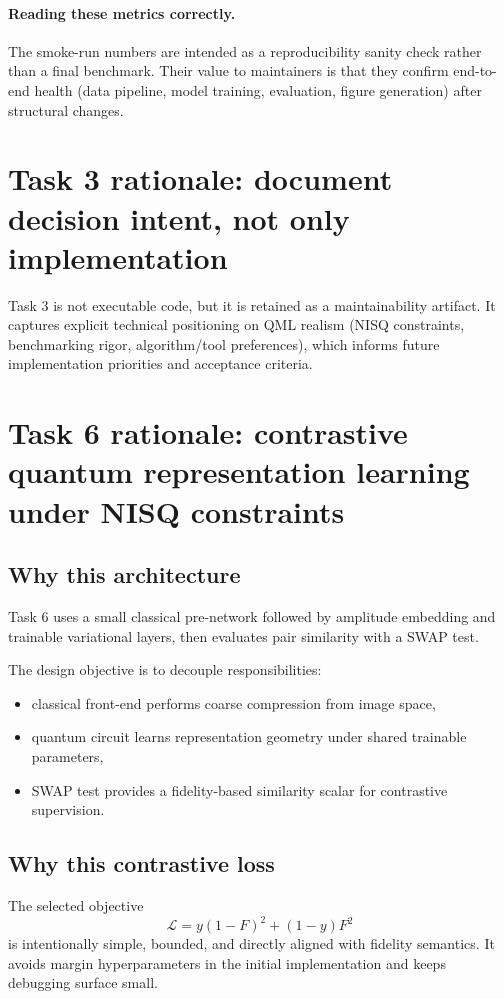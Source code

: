 \documentclass[11pt]{article}
\begin{document}
\paragraph{Reading these metrics correctly.}
The smoke-run numbers are intended as a reproducibility sanity check rather than a final benchmark. Their value to maintainers is that they confirm end-to-end health (data pipeline, model training, evaluation, figure generation) after structural changes.

\section{Task 3 rationale: document decision intent, not only implementation}
Task 3 is not executable code, but it is retained as a maintainability artifact.
It captures explicit technical positioning on QML realism (NISQ constraints, benchmarking rigor,
algorithm/tool preferences), which informs future implementation priorities and acceptance criteria.

\section{Task 6 rationale: contrastive quantum representation learning under NISQ constraints}
\subsection{Why this architecture}
Task 6 uses a small classical pre-network followed by amplitude embedding and trainable
variational layers, then evaluates pair similarity with a SWAP test.

The design objective is to decouple responsibilities:
\begin{itemize}[leftmargin=1.3em]
    \item classical front-end performs coarse compression from image space,
    \item quantum circuit learns representation geometry under shared trainable parameters,
    \item SWAP test provides a fidelity-based similarity scalar for contrastive supervision.
\end{itemize}

\subsection{Why this contrastive loss}
The selected objective
\begin{equation}
\mathcal{L}=y(1-F)^2+(1-y)F^2
\end{equation}
is intentionally simple, bounded, and directly aligned with fidelity semantics.
It avoids margin hyperparameters in the initial implementation and keeps debugging surface small.
\end{document}
